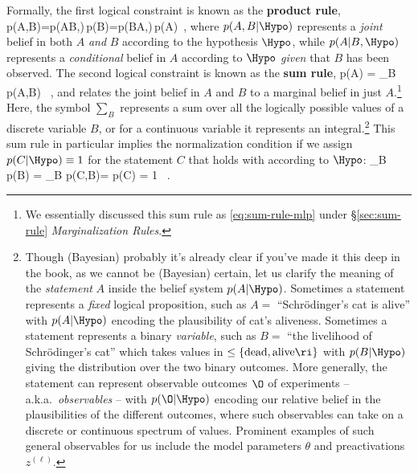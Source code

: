 Formally, the first logical constraint is known as the \textbf{product rule},
\be\label{eq:logical-product}
p(A,B\vert\Hypo)=p(A\vert B,\Hypo)\,p(B\vert\Hypo)=p(B\vert A,\Hypo)\,p(A\vert\Hypo)\, ,
\ee
where $p(A,B\vert\Hypo)$ represents a \emph{joint} belief in both $A$ \emph{and} $B$ 
according to the hypothesis $\Hypo$, while $p(A\vert B,\Hypo)$ represents a \emph{conditional} belief 
in $A$
according to $\Hypo$ \emph{given} that $B$ 
has been observed.
The second logical constraint is known as the \textbf{sum rule},
\be\label{eq:logical-sum}
p(A\vert\Hypo) = \sum_{B} p(A,B\vert\Hypo) \, ,
\ee
and relates the joint belief in $A$ and $B$ to a marginal belief in just $A$.\footnote{We essentially discussed this sum rule as \eqref{eq:sum-rule-mlp}
under \S\ref{sec:sum-rule} \emph{Marginalization Rules}. 
}
Here, the symbol $\sum_{B}$ represents a sum over all the logically possible values of a discrete variable $B$,
or for a continuous variable it represents an integral.\footnote{Though (Bayesian) probably it's already clear if you've made it this deep in the book, as we cannot be (Bayesian) certain, let us clarify the meaning of the \emph{statement} $A$ inside the belief system $p(A\vert\Hypo)$. Sometimes a statement represents a \emph{fixed} logical proposition, such as $A=$ ``Schr\"{o}dinger's cat is alive'' with $p(A\vert\Hypo)$ encoding the plausibility of cat's aliveness. Sometimes a statement represents a binary \emph{variable}, such as $B=$ ``the livelihood of Schr\"{o}dinger's cat'' which takes values in $\le\{\text{dead}, \text{alive}\ri\}$ with $p(B\vert\Hypo)$ giving the distribution over the two binary outcomes.
More generally, the statement can represent observable outcomes $\O$ of experiments -- a.k.a.~\emph{observables} -- with $p(\O\vert \Hypo)$ encoding our relative belief in the plausibilities of the different outcomes, where such observables can take on a discrete or continuous spectrum of values. Prominent examples of such general observables for us include the model parameters $\theta$ and preactivations $z^{(\ell)}$.
}
This sum rule in particular implies the normalization condition if we assign $p(C\vert\Hypo) \equiv 1$ for the statement $C$ that holds with  according to $\Hypo$: 
\be
\sum_{B} p(B\vert\Hypo) = \sum_{B} p(C,B\vert\Hypo)= p(C\vert\Hypo) = 1 \, .
\ee







